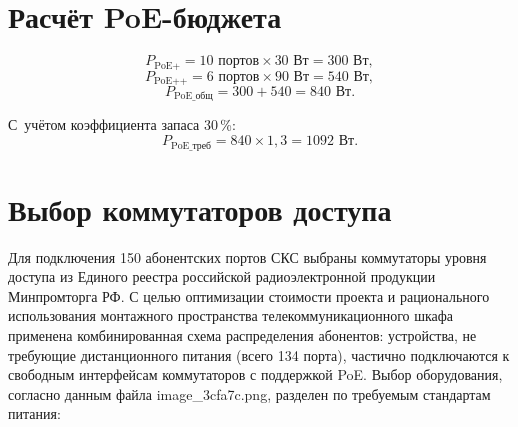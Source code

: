 \documentclass[a4paper,oneside,14pt]{extreport}
\begin{document}
\section{Расчёт PoE-бюджета}

\begin{equation}
    P_{\text{PoE+}} = 10 \text{ портов} \times 30 \text{ Вт} = 300 \text{ Вт},
    \label{eq:poe_plus}
\end{equation}
\begin{equation}
    P_{\text{PoE++}} = 6 \text{ портов} \times 90 \text{ Вт} = 540 \text{ Вт},
    \label{eq:poe_plusplus}
\end{equation}
\begin{equation}
    P_{\text{PoE\_общ}} = 300 + 540 = 840 \text{ Вт}.
    \label{eq:poe_total}
\end{equation}

С~учётом коэффициента запаса 30\,\%:
\begin{equation}
    P_{\text{PoE\_треб}} = 840 \times 1{,}3 = 1092 \text{ Вт}.
    \label{eq:poe_required}
\end{equation}

\section{Выбор коммутаторов доступа}

Для подключения 150 абонентских портов СКС выбраны коммутаторы уровня доступа из Единого реестра российской радиоэлектронной продукции Минпромторга РФ. С целью оптимизации стоимости проекта и рационального использования монтажного пространства телекоммуникационного шкафа применена комбинированная схема распределения абонентов: устройства, не требующие дистанционного питания (всего 134 порта), частично подключаются к свободным интерфейсам коммутаторов с поддержкой PoE. Выбор оборудования, согласно данным файла image\_3cfa7c.png, разделен по требуемым стандартам питания:
\end{document}
